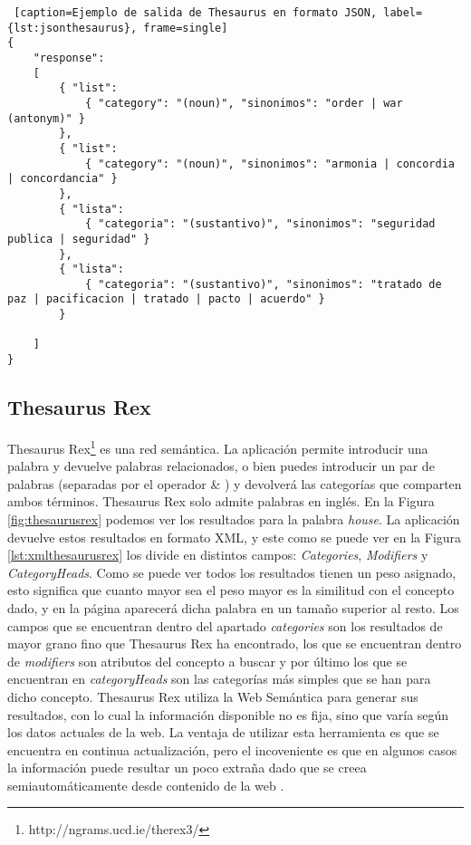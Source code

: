 
\begin{lstlisting} [caption=Ejemplo de salida de Thesaurus en formato JSON, label={lst:jsonthesaurus}, frame=single]
{
	"response":
	[
		{ "list": 
			{ "category": "(noun)", "sinonimos": "order | war (antonym)" }
		},
		{ "list": 
			{ "category": "(noun)", "sinonimos": "armonia | concordia | concordancia" }
		},
		{ "lista": 
			{ "categoria": "(sustantivo)", "sinonimos": "seguridad publica | seguridad" }
		},
		{ "lista": 
			{ "categoria": "(sustantivo)", "sinonimos": "tratado de paz | pacificacion | tratado | pacto | acuerdo" }
		}
	
	]
}
\end{lstlisting}




\subsection{Thesaurus Rex}
\label{cap:subsec:thesaurusrex}

Thesaurus Rex\footnote{http://ngrams.ucd.ie/therex3/} es una red semántica. La aplicación permite introducir una palabra y devuelve palabras relacionados, o bien puedes introducir un par de palabras (separadas por el operador  \& ) y devolverá las categorías que comparten ambos términos.
Thesaurus Rex solo admite palabras en inglés. En la Figura \ref{fig:thesaurusrex} podemos ver los resultados para la palabra  \textit{house}.
La aplicación devuelve estos resultados en formato XML, y este como se puede ver en la Figura \ref{lst:xmlthesaurusrex} los divide en distintos campos: \textit{Categories}, \textit{Modifiers} y \textit{CategoryHeads}. Como se puede ver todos los resultados tienen un peso asignado, esto significa que cuanto mayor sea el peso mayor es la similitud con el concepto dado, y en la página aparecerá dicha palabra en un tamaño superior al resto.
Los campos que se encuentran dentro del apartado \textit{categories} son los resultados de mayor grano fino que Thesaurus Rex ha encontrado, los que se encuentran dentro de  \textit{modifiers} son atributos del concepto a buscar y por último los que se encuentran en \textit{categoryHeads} son las categorías más simples que se han para dicho concepto.
Thesaurus Rex utiliza la Web Semántica para generar sus resultados, con lo cual la información disponible no es fija, sino que varía según los datos actuales de la web.
La ventaja de utilizar esta herramienta es que se encuentra en continua actualización, pero el incoveniente es que en algunos casos la información puede resultar un poco extraña dado que se creea semiautomáticamente desde contenido de la web \citep{TFMPaloma}.

